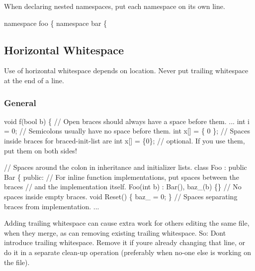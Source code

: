When declaring nested namespaces, put each namespace on its own line.


\begin{DoxyCode}
\textcolor{keyword}{namespace }foo \{
\textcolor{keyword}{namespace }bar \{
\end{DoxyCode}


\subsection*{Horizontal Whitespace}

Use of horizontal whitespace depends on location. Never put trailing whitespace at the end of a line.

\subsubsection*{General}


\begin{DoxyCode}
\textcolor{keywordtype}{void} f(\textcolor{keywordtype}{bool} b) \{  \textcolor{comment}{// Open braces should always have a space before them.}
    ...
int i = 0;  \textcolor{comment}{// Semicolons usually have no space before them.}
\textcolor{keywordtype}{int} x[] = \{ 0 \};  \textcolor{comment}{// Spaces inside braces for braced-init-list are}
\textcolor{keywordtype}{int} x[] = \{0\};    \textcolor{comment}{// optional.  If you use them, put them on both sides!}

\textcolor{comment}{// Spaces around the colon in inheritance and initializer lists.}
\textcolor{keyword}{class }Foo : \textcolor{keyword}{public} Bar \{
\textcolor{keyword}{public}:
    \textcolor{comment}{// For inline function implementations, put spaces between the braces}
    \textcolor{comment}{// and the implementation itself.}
    Foo(\textcolor{keywordtype}{int} b) : Bar(), baz\_(b) \{\}  \textcolor{comment}{// No spaces inside empty braces.}
    \textcolor{keywordtype}{void} Reset() \{ baz\_ = 0; \}  \textcolor{comment}{// Spaces separating braces from implementation.}
    ...
\end{DoxyCode}


Adding trailing whitespace can cause extra work for others editing the same file, when they merge, as can removing existing trailing whitespace. So\+: Don\textquotesingle{}t introduce trailing whitespace. Remove it if you\textquotesingle{}re already changing that line, or do it in a separate clean-\/up operation (preferably when no-\/one else is working on the file).

